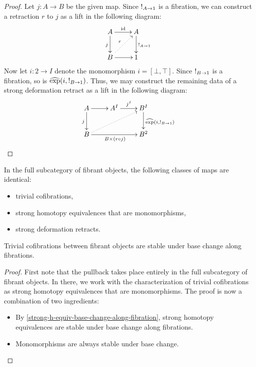 \documentclass[reqno,10pt,a4paper,oneside]{amsart}
\begin{document}
\begin{proof}
Let $j : A \to B$ be the given map.
Since $\mathord{!}_{A \to 1}$ is a fibration, we can construct a retraction $r$ to $j$ as a lift in the following diagram:
\[
\xymatrix{
  A
  \ar[r]^{\id}
  \ar[d]_{j}
&
  A
  \ar[d]^{\canonical_{A \to 1}}
\\
  B
  \ar[r]
  \ar@{.>}[ur]^{r}
&
  1
}
\]
Now let $i : 2 \to I$ denote the monomorphism $i = [\bot, \top]$.
Since $\mathord{!}_{B \to 1}$ is a fibration, so is $\operatorname{\widehat{exp}}(i, \mathord{!}_{B \to 1})$.
Thus, we may construct the remaining data of a strong deformation retract as a lift in the following diagram:
\[
\xymatrix{
  A
  \ar[r]
  \ar[d]_{j}
&
  A^I
  \ar[r]^{j^I}
&
  B^I
  \ar[d]^{\hatexp(i, \canonical_{B \to 1})}
\\
  B
  \ar[rr]_{B \times (r \cc j)}
  \ar@{.>}[urr]
&&
  B^2
}
\]
\end{proof}

\begin{corollary}
\label{anodyne-between-fibrant-characterization}
In the full subcategory of fibrant objects, the following classes of maps are identical:
\begin{itemize}
\item
trivial cofibrations,
\item
strong homotopy equivalences that are monomorphisms,
\item
strong deformation retracts.
\end{itemize}
\end{corollary}

\begin{lemma}
\label{fibration-base-change-of-anodyne-between-fibrant}
Trivial cofibrations between fibrant objects are stable under base change along fibrations.
\end{lemma}

\begin{proof}
First note that the pullback takes place entirely in the full subcategory of fibrant objects.
In there, we work with the characterization of trivial cofibrations as strong homotopy equivalences that are monomorphisms.
The proof is now a combination of two ingredients:
\begin{itemize}
\item
By \cref{strong-h-equiv-base-change-along-fibration}, strong homotopy equivalences are stable under base change along fibrations.
\item
Monomorphisms are always stable under base change.
\end{itemize}
\end{proof}
\end{document}
